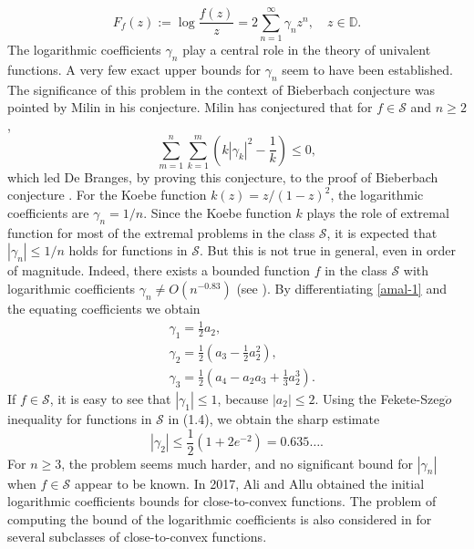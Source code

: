 \documentclass[a4paper,12pt]{amsart}
\theoremstyle{definition}
\numberwithin{equation}{section}
\begin{document}
\begin{equation}\label{amal-1}
	F_{f}(z):= \log\frac{f(z)}{z}=2\sum\limits_{n=1}^{\infty}\gamma_{n}z^{n}, \quad z \in \mathbb{D}.
\end{equation}
The logarithmic coefficients $\gamma_{n}$ play a central role in the theory of univalent functions. A very few exact upper bounds for $\gamma_{n}$ seem to have been established. The significance of this problem in the context of Bieberbach conjecture was pointed by Milin\cite{milin} in his conjecture. Milin \cite{milin} has conjectured that for $f\in \mathcal{S}$ and $n\ge 2$, 
$$\sum\limits_{m=1}^{n}\sum\limits_{k=1}^{m}\left(k|\gamma_{k}|^{2}-\frac{1}{k}\right)\le 0,$$
which led De Branges, by proving this conjecture, to the proof of Bieberbach conjecture  \cite{De Branges-1985}. For the Koebe function $k(z)=z/(1-z)^{2}$, the logarithmic coefficients are $\gamma_{n}=1/n$. Since the Koebe function $k$ plays the role of extremal function for most of the extremal problems in the class $\mathcal{S}$, it is expected that $|\gamma_{n}|\le1/n$ holds for functions in $\mathcal{S}$. But this is not true in general, even in order of magnitude. Indeed, there exists a bounded function $f$ in the class $\mathcal{S}$ with logarithmic coefficients $\gamma_{n}\ne O(n^{-0.83})$ (see \cite[Theorem 8.4]{Duren-book-1983}). By differentiating \eqref{amal-1} and  the equating coefficients we obtain
\begin{equation}\label{gamma}
\begin{aligned}
& \gamma_{1}=\frac{1}{2}a_{2}, \\[2mm]
& \gamma_{2}=\frac{1}{2}(a_{3}-\frac{1}{2}a_{2}^{2}),\\[2mm]
& \gamma_{3}=\frac{1}{2}(a_{4}-a_{2}a_{3}+\frac{1}{3}a_{2}^{3}).
\end{aligned}
\end{equation}
If $f\in \mathcal{S}$, it is easy to see that $|\gamma_{1}|\le 1$, because $|a_2| \leq 2$. Using the Fekete-Szeg$\ddot{o}$ inequality \cite[Theorem 3.8]{Duren-book-1983} for functions in $\mathcal{S}$ in (1.4), we obtain the sharp estimate 
$$|\gamma_{2}|\le\frac{1}{2}\left(1+2e^{-2}\right)=0.635\ldots.$$
For $n\ge 3$, the problem seems much harder, and no significant bound for $|\gamma_{n}|$ when $f\in \mathcal{S}$ appear to be known. In 2017, Ali and Allu\cite{vasu2017} obtained the initial logarithmic coefficients bounds for close-to-convex functions. The problem of computing the bound of the logarithmic coefficients is also considered in \cite{cho,PSW20,vasu-2018,Thomas-2016} for several subclasses of close-to-convex functions.
\end{document}
